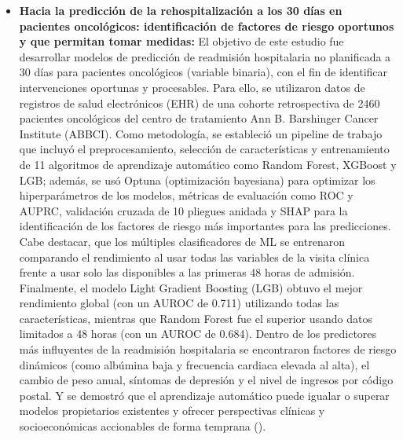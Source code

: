 \begin{itemize}
    \item \textbf{Hacia la predicción de la rehospitalización a los 30 días en pacientes oncológicos: identificación de factores de riesgo oportunos y que permitan tomar medidas:} El objetivo de este estudio fue desarrollar modelos de predicción de readmisión hospitalaria no planificada a 30 días para pacientes oncológicos (variable binaria), con el fin de identificar intervenciones oportunas y procesables. Para ello, se utilizaron datos de registros de salud electrónicos (EHR) de una cohorte retrospectiva de 2460 pacientes oncológicos del centro de tratamiento Ann B. Barshinger Cancer Institute (ABBCI). Como metodología, se estableció un pipeline de trabajo que incluyó el preprocesamiento, selección de características y entrenamiento de 11 algoritmos de aprendizaje automático como Random Forest, XGBoost y LGB; además, se usó Optuna (optimización bayesiana) para optimizar los hiperparámetros de los modelos, métricas de evaluación como ROC y AUPRC, validación cruzada de 10 pliegues anidada y SHAP para la identificación de los factores de riesgo más importantes para las predicciones. Cabe destacar, que los múltiples clasificadores de ML se entrenaron comparando el rendimiento al usar todas las variables de la visita clínica frente a usar solo las disponibles a las primeras 48 horas de admisión. Finalmente, el modelo Light Gradient Boosting (LGB) obtuvo el mejor rendimiento global (con un AUROC de 0.711) utilizando todas las características, mientras que Random Forest fue el superior usando datos limitados a 48 horas (con un AUROC de 0.684). Dentro de los predictores más influyentes de la readmisión hospitalaria se encontraron factores de riesgo dinámicos (como albúmina baja y frecuencia cardiaca elevada al alta), el cambio de peso anual, síntomas de depresión y el nivel de ingresos por código postal. Y se demostró que el aprendizaje automático puede igualar o superar modelos propietarios existentes y ofrecer perspectivas clínicas y socioeconómicas accionables de forma temprana (\cite{article3}).

\end{itemize}
